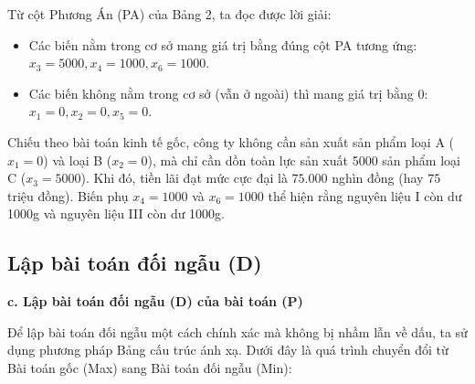 Từ cột Phương Án (PA) của Bảng 2, ta đọc được lời giải:
\begin{itemize}
    \item Các biến nằm trong cơ sở mang giá trị bằng đúng cột PA tương ứng: $x_3 = 5000, x_4 = 1000, x_6 = 1000$.
    \item Các biến không nằm trong cơ sở (vẫn ở ngoài) thì mang giá trị bằng $0$: $x_1 = 0, x_2 = 0, x_5 = 0$.
\end{itemize}
Chiếu theo bài toán kinh tế gốc, công ty không cần sản xuất sản phẩm loại A ($x_1=0$) và loại B ($x_2=0$), mà chỉ cần dồn toàn lực sản xuất 5000 sản phẩm loại C ($x_3=5000$). Khi đó, tiền lãi đạt mức cực đại là $75.000$ nghìn đồng (hay $75$ triệu đồng). Biến phụ $x_4 = 1000$ và $x_6 = 1000$ thể hiện rằng nguyên liệu I còn dư 1000g và nguyên liệu III còn dư 1000g.

\vspace{0.8cm}
\subsection{Lập bài toán đối ngẫu (D)}
\textbf{c. Lập bài toán đối ngẫu (D) của bài toán (P)}

Để lập bài toán đối ngẫu một cách chính xác mà không bị nhầm lẫn về dấu, ta sử dụng phương pháp Bảng cấu trúc ánh xạ. Dưới đây là quá trình chuyển đổi từ Bài toán gốc (Max) sang Bài toán đối ngẫu (Min):

